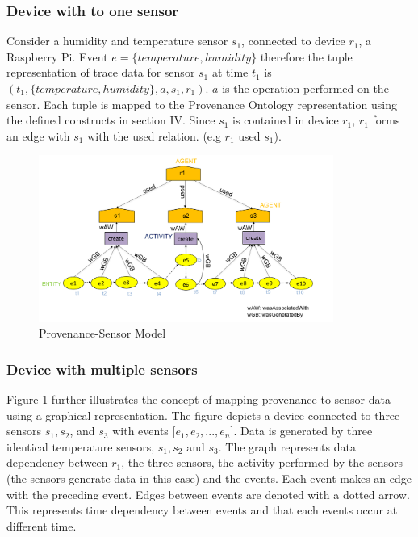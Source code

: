 \documentclass[conference]{IEEEtran}
\begin{document}





\subsubsection{Device with to one sensor} 

Consider a humidity and temperature sensor $s_1$, connected to device $r_1$, a Raspberry Pi. Event $e= \{temperature, humidity\}$ therefore the tuple representation of trace data for sensor $s_1$ at time $t_1$ is $(t_1, \{temperature, humidity\}, a,  s_1, r_1)$. $a$ is the operation performed on the sensor. Each tuple is mapped to the Provenance Ontology representation using the defined constructs in section IV. Since $s_1$ is contained in device $r_1$, $r_1$ forms an edge with $s_1$ with the used relation. (e.g $r_1$ used $s_1$). 

\begin{figure}[h!]
\begin{center}

\includegraphics[width=3.8in]{prov_sensor_10.PNG}
\end{center}
\caption{Provenance-Sensor Model }
\label{prov_sensor}
\end{figure}

\subsubsection{Device with multiple sensors} 
Figure \ref{prov_sensor} further illustrates the concept of mapping provenance to sensor data using a graphical representation. The figure depicts a device connected to three sensors $s_1, s_2$, and $s_3$ with events  [$e_1, e_2,...,e_n$]. Data is generated by three identical temperature sensors, $s_1, s_2$ and $s_3$. The graph represents data dependency between $r_1$, the three sensors, the activity performed by the sensors (the sensors generate data in this case) and the events.  Each event makes an edge with the preceding event. Edges between events are denoted with a dotted arrow. This represents time dependency between events and that each events occur at different time. 
\end{document}
